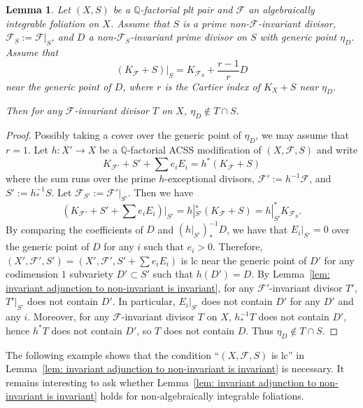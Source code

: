 \documentclass[11pt,reqno]{amsart}
\numberwithin{equation}{section}
\newcommand{\Ff}{\mathcal{F}}
\newtheorem{lem}[thm]{Lemma}
\theoremstyle{definition}
\begin{document}
\begin{lem}\label{lem: restriction ii}
Let $(X,S)$ be a $\mathbb Q$-factorial plt pair and $\Ff$ an algebraically integrable foliation on $X$. Assume that $S$ is a prime non-$\Ff$-invariant divisor, $\Ff_S:=\Ff|_S$, and $D$ a non-$\Ff_S$-invariant prime divisor on $S$ with generic point $\eta_D$. Assume that
$$(K_{\Ff}+S)|_S=K_{\Ff_S}+\frac{r-1}{r}D$$
near the generic point of $D$, where $r$ is the Cartier index of $K_X+S$ near $\eta_D$. 

Then for any $\Ff$-invariant divisor $T$ on $X$, $\eta_D\not\in T\cap S$.
\end{lem}
\begin{proof}
Possibly taking a cover over the generic point of $\eta_D$, we may assume that $r=1$. Let $h\colon X'\rightarrow X$ be a $\mathbb Q$-factorial ACSS modification of $(X,\Ff,S)$ \cite[Theorem~2.5.1]{CHLX23} and write
    $$K_{\Ff'}+S'+\sum e_iE_i=h^*(K_{\Ff}+S)$$
    where the sum runs over the prime $h$-exceptional divisors, $\Ff':=h^{-1}\Ff$, and $S':=h^{-1}_*S$. Let $\Ff_{S'}:=\Ff'|_{S'}$. Then we have 
    $$\left(K_{\Ff'}+S'+\sum e_iE_i\right)\bigg|_{S'}=h|_{S'}^*(K_{\Ff}+S)=h|_{S'}^*K_{\Ff_S}.$$
By comparing the coefficients of $D$ and $(h|_{S'})^{-1}_*D$, we have that $E_i|_{S'}=0$ over the generic point of $D$ for any $i$ such that $e_i>0$. Therefore, $(X',\Ff',S')=(X',\Ff',S'+\sum e_iE_i)$ is lc near the generic point of $D'$ for any codimension $1$ subvariety $D'\subset S'$ such that $h(D')=D$. By Lemma~\ref{lem: invariant adjunction to non-invariant is invariant}, for any $\Ff'$-invariant divisor $T'$, $T'|_{S'}$ does not contain $D'$. In particular, $E_i|_{S'}$ does not contain $D'$ for any $D'$ and any $i$. Moreover, for any $\Ff$-invariant divisor $T$ on $X$, $h^{-1}_*T$ does not contain $D'$, hence $h^*T$ does not contain $D'$, so $T$ does not contain $D$. Thus $\eta_D\not\in T\cap S$.
\end{proof}

The following example shows that the condition ``$(X,\mathcal F, S)$ is lc'' in Lemma~\ref{lem: invariant adjunction to non-invariant is invariant} is necessary. It remains interesting to ask whether Lemma~\ref{lem: invariant adjunction to non-invariant is invariant} holds for non-algebraically integrable foliations.
    
\end{document}

